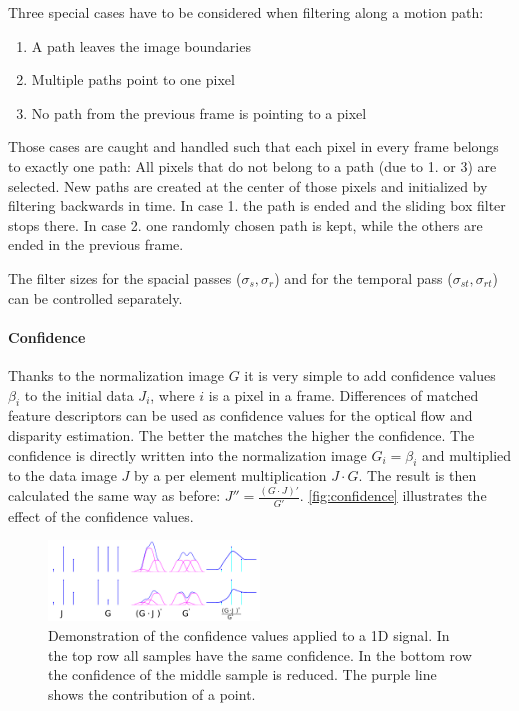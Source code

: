 \documentclass{utue} %
\begin{document}
Three special cases have to be considered when filtering along a motion path:
\begin{enumerate}
  \item A path leaves the image boundaries
  \item Multiple paths point to one pixel
  \item No path from the previous frame is pointing to a pixel 
\end{enumerate}
Those cases are caught and handled such that each pixel in every frame belongs
to exactly one path: All pixels that do not belong to a path (due to 1. or 3)
are selected. New paths are created at the center of those pixels and
initialized by filtering backwards in time. In case 1. the path is ended and the
sliding box filter stops there. In case 2. one randomly chosen path is kept,
while the others are ended in the previous frame.

The filter sizes for the spacial passes ($\sigma_s, \sigma_r$) and for the
temporal pass ($\sigma_{st}, \sigma_{rt}$) can be controlled separately.

\paragraph{Confidence} \label{confidence}
Thanks to the normalization image $G$ it is very simple to add confidence values
$\beta_i$ to the initial data $J_i$, where $i$ is a pixel in a frame.
Differences of matched feature descriptors can be used as confidence values for
the optical flow and disparity estimation. The better the matches the higher the
confidence. The confidence is directly written into the normalization image $G_i
= \beta_i$ and multiplied to the data image $J$ by a per element multiplication
$J \cdot G$.  The result is then calculated the same way as before: $J'' =
\frac{(G\cdot J)'}{G'}$. \autoref{fig:confidence} illustrates the effect of the
confidence values.

\begin{figure}[htb]
  \centering
  \includegraphics[width=0.5\textwidth]{images/confidence.png}
  \caption{Demonstration of the confidence values applied to a 1D signal. In the
    top row all samples have the same confidence. In the bottom row the
    confidence of the middle sample is reduced. The
    purple line shows the contribution of a point.}
  \label{fig:confidence}
\end{figure}
\end{document}
